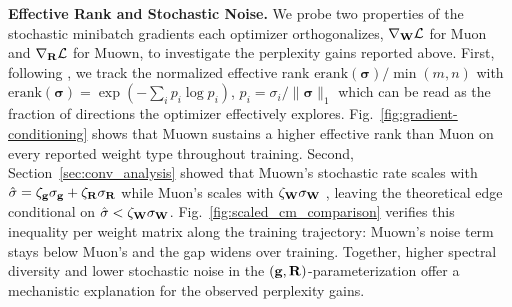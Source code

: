 \documentclass{article}
\newcommand{\algname}{Muown}
\begin{document}
\textbf{Effective Rank and Stochastic Noise.} We probe two properties of the stochastic minibatch gradients each optimizer orthogonalizes, $\nabla_{\mathbf{W}}\mathcal L$ for Muon and $\nabla_{\mathbf{R}}\mathcal L$ for \algname{}, to investigate the perplexity gains reported above. First, following \citet{ahn_dion_2025}, we track the normalized effective rank $\mathrm{erank}(\boldsymbol\sigma)/\min(m,n)$ with $\mathrm{erank}(\boldsymbol\sigma) = \exp(-\sum_i p_i\log p_i)$, $p_i = \sigma_i/\|\boldsymbol\sigma\|_1$ \citep{roy_effective_2007} which can be read as the fraction of directions the optimizer effectively explores. Fig.~\ref{fig:gradient-conditioning} shows that \algname{} sustains a higher effective rank than Muon on every reported weight type throughout training. Second, Section~\ref{sec:conv_analysis} showed that \algname{}'s stochastic rate scales with $\hat\sigma = \zeta_{\mathbf{g}}\sigma_{\mathbf{g}} + \zeta_{\mathbf{R}}\sigma_{\mathbf{R}}$ while Muon's scales with $\zeta_{\mathbf{W}}\sigma_{\mathbf{W}}$ \citep{ConvergenceAnalysisMuon2025shen}, leaving the theoretical edge conditional on $\hat\sigma < \zeta_{\mathbf{W}}\sigma_{\mathbf{W}}$. Fig.~\ref{fig:scaled_cm_comparison} verifies this inequality per weight matrix along the training trajectory: \algname{}'s noise term stays below Muon's and the gap widens over training. Together, higher spectral diversity and lower stochastic noise in the $(\mathbf{g}, \mathbf{R})$-parameterization offer a mechanistic explanation for the observed perplexity gains.
\end{document}
